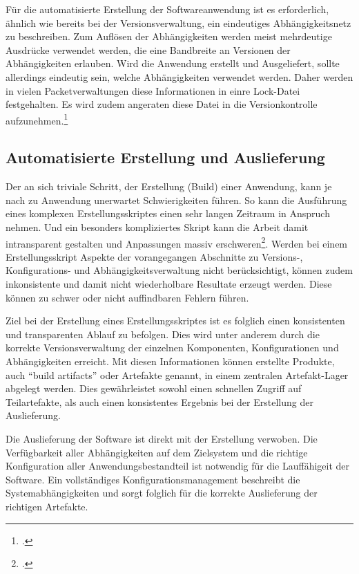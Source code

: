 Für die automatisierte Erstellung der Softwareanwendung ist es erforderlich, ähnlich wie bereits bei der 
Versionsverwaltung, ein eindeutiges Abhängigkeitsnetz zu beschreiben. Zum Auflösen der Abhängigkeiten werden meist 
mehrdeutige Ausdrücke verwendet werden, die eine Bandbreite an Versionen der Abhängigkeiten erlauben. Wird die Anwendung 
erstellt und Ausgeliefert, sollte allerdings eindeutig sein, welche Abhängigkeiten verwendet werden. Daher werden in 
vielen Packetverwaltungen diese Informationen in einre Lock-Datei festgehalten. Es wird zudem angeraten diese Datei in 
die Versionkontrolle aufzunehmen.\footcite{composer-why-lock-in-vcs}

\subsection{Automatisierte Erstellung und Auslieferung}

Der an sich triviale Schritt, der Erstellung (Build) einer Anwendung, kann je nach zu Anwendung unerwartet 
Schwierigkeiten führen. So kann die Ausführung eines komplexen Erstellungsskriptes einen sehr langen Zeitraum in Anspruch 
nehmen. Und ein besonders kompliziertes Skript kann die Arbeit damit intransparent gestalten und Anpassungen massiv 
erschweren\footcite{ci-is-not-build-systems}. Werden bei einem Erstellungsskript Aspekte der vorangegangen Abschnitte zu 
Versions-, Konfigurations- und Abhängigkeitsverwaltung nicht berücksichtigt, können zudem inkonsistente und damit nicht 
wiederholbare Resultate erzeugt werden. Diese können zu schwer oder nicht auffindbaren Fehlern führen.

Ziel bei der Erstellung eines Erstellungsskriptes ist es folglich einen konsistenten und transparenten Ablauf zu 
befolgen. Dies wird unter anderem durch die korrekte Versionsverwaltung der einzelnen Komponenten, Konfigurationen und 
Abhängigkeiten erreicht. Mit diesen Informationen können erstellte Produkte, auch ``build artifacts'' oder Artefakte 
genannt, in einem zentralen Artefakt-Lager abgelegt werden. Dies gewährleistet sowohl einen schnellen Zugriff auf 
Teilartefakte, als auch einen konsistentes Ergebnis bei der Erstellung der Auslieferung.

Die Auslieferung der Software ist direkt mit der Erstellung verwoben. Die Verfügbarkeit aller Abhängigkeiten auf dem 
Zielsystem und die richtige Konfiguration aller Anwendungsbestandteil ist notwendig für die Lauffähigeit der Software. 
Ein vollständiges Konfigurationsmanagement beschreibt die Systemabhängigkeiten und sorgt folglich für die korrekte 
Auslieferung der richtigen Artefakte.

